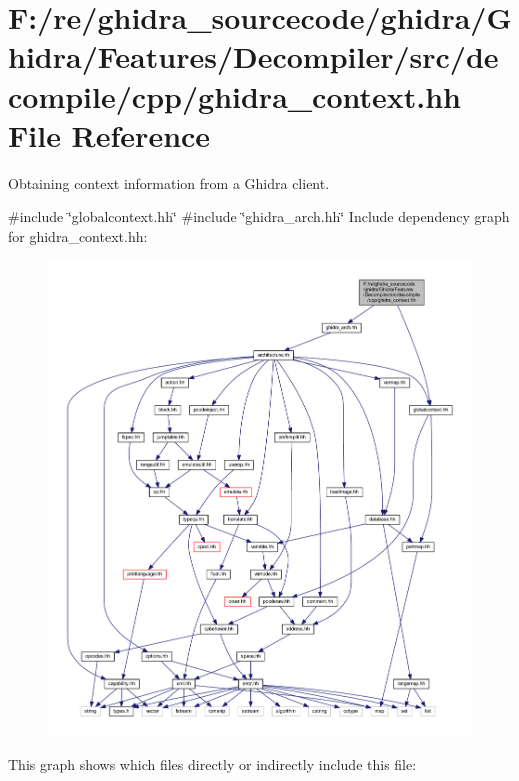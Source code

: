 \hypertarget{ghidra__context_8hh}{}\section{F\+:/re/ghidra\+\_\+sourcecode/ghidra/\+Ghidra/\+Features/\+Decompiler/src/decompile/cpp/ghidra\+\_\+context.hh File Reference}
\label{ghidra__context_8hh}


Obtaining context information from a Ghidra client.  


{\ttfamily \#include \char`\"{}globalcontext.\+hh\char`\"{}}\newline
{\ttfamily \#include \char`\"{}ghidra\+\_\+arch.\+hh\char`\"{}}\newline
Include dependency graph for ghidra\+\_\+context.\+hh\+:
\nopagebreak
\begin{figure}[H]
\begin{center}
\leavevmode
\includegraphics[width=350pt]{ghidra__context_8hh__incl}
\end{center}
\end{figure}
This graph shows which files directly or indirectly include this file\+:
